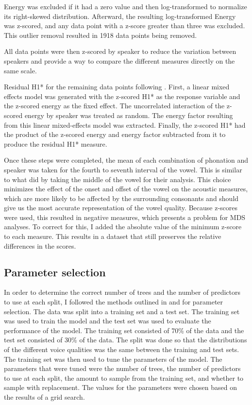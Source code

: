 Energy was excluded if it had a zero value and then log-transformed to normalize its right-skewed distribution. Afterward, the resulting log-transformed Energy was z-scored, and any data point with a z-score greater than three was excluded. This outlier removal resulted in 1918 data points being removed. 

All data points were then z-scored by speaker to reduce the variation between speakers and provide a way to compare the different measures directly on the same scale.

Residual H1* for the remaining data points following \citet{chaiH1H2AcousticMeasure2022}. First, a linear mixed effects model was generated with the z-scored H1* as the response variable and the z-scored energy as the fixed effect. The uncorrelated interaction of the z-scored energy by speaker was treated as random. The energy factor resulting from this linear mixed-effects model was extracted. Finally, the z-scored H1* had the product of the z-scored energy and energy factor subtracted from it to produce the residual H1* measure. 

Once these steps were completed, the mean of each combination of phonation and speaker was taken for the fourth to seventh interval of the vowel. This is similar to what \citet{keatingCrosslanguageAcousticSpace2023} did by taking the middle of the vowel for their analysis. This choice minimizes the effect of the onset and offset of the vowel on the acoustic measures, which are more likely to be affected by the surrounding consonants and should give us the most accurate representation of the vowel quality. Because z-scores were used, this resulted in negative measures, which presents a problem for MDS analyses. To correct for this, I added the absolute value of the minimum z-score to each measure. This results in a dataset that still preserves the relative differences in the scores. 
\subsection{Parameter selection} \label{sec:bagging_model}

In order to determine the correct number of trees and the number of predictors to use at each split, I followed the methods outlined in \citet{boehmkeHandsOnMachineLearning2019} and \citet{jamesIntroductionStatisticalLearning2021} for parameter selection. The data was split into a training set and a test set. The training set was used to train the model and the test set was used to evaluate the performance of the model. The training set consisted of 70\% of the data and the test set consisted of 30\% of the data. The split was done so that the distributions of the different voice qualities was the same between the training and test sets. The training set was then used to tune the parameters of the model. The parameters that were tuned were the number of trees, the number of predictors to use at each split, the amount to sample from the training set, and whether to sample with replacement. The values for the parameters were chosen based on the results of a grid search.

